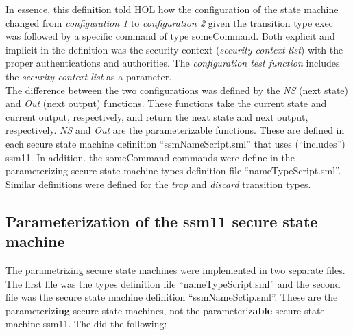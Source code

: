   In essence, this definition told HOL how the configuration of the state machine changed from
  \textit{configuration 1} to \textit{configuration 2} given the transition type exec was followed by a specific
  command of type someCommand. Both explicit and implicit in the definition was the security context
  (\textit{security context list}) with the proper authentications and authorities. The \textit{configuration test
  function} includes the \textit{security context list} as a parameter.\\

  The difference between the two configurations was defined by the \textit{NS} (next state) and \textit{Out} (next output)
  functions. These functions take the current state and current output, respectively, and return the
  next state and next output, respectively. \textit{NS} and \textit{Out} are the parameterizable functions. These are
  defined in each secure state machine definition “ssmNameScript.sml” that uses (“includes”) ssm11.
  In addition. the someCommand commands were define in the parameterizing secure state machine types
  definition file “nameTypeScript.sml”. Similar definitions were defined for the \textit{trap} and \textit{discard}
  transition types.
  
\subsection{Parameterization of the ssm11 secure state machine}
\label{sec:param-ssm11-secure-1}

The parametrizing secure state machines were implemented in two separate files. The first
file was the types definition file “nameTypeScript.sml” and the second file was the secure
state machine definition “ssmNameSctip.sml”. These are the parameteriz\textbf{ing} secure state machines,
not the parameteriz\textbf{able} secure state machine ssm11. The did the following:

